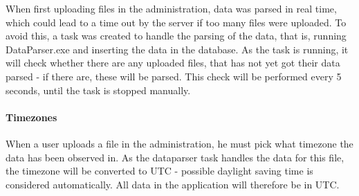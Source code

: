 When first uploading files in the administration, data was parsed in real time, which could lead to a time out by the server if too many files were uploaded. To avoid this, a task was created to handle the parsing of the data, that is, running DataParser.exe and inserting the data in the database. As the task is running, it will check whether there are any uploaded files, that has not yet got their data parsed - if there are, these will be parsed. This check will be performed every 5 seconds, until the task is stopped manually.

\paragraph{Timezones}
When a user uploads a file in the administration, he must pick what timezone the data has been observed in. As the dataparser task handles the data for this file, the timezone will be converted to UTC - possible daylight saving time is considered automatically. All data in the application will therefore be in UTC.